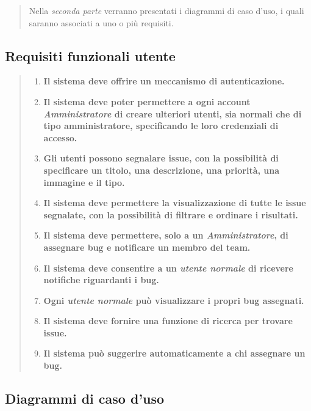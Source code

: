 \begin{quote}
Nella \textit{seconda parte} verranno presentati i diagrammi di caso d'uso, i quali saranno associati a uno o più requisiti.
\end{quote}

\subsection{Requisiti funzionali utente}
\begin{quote}
\begin{enumerate}[label=\textit{RF\arabic*}]
  \item \textbf{Il sistema deve offrire un meccanismo di autenticazione.}
    
  \item \textbf{Il sistema deve poter permettere a ogni account \textit{Amministratore} di creare ulteriori utenti, sia normali che di tipo amministratore, specificando le loro credenziali di accesso. }
  
  \item \textbf{Gli utenti possono segnalare issue, con la possibilità di specificare un titolo, una descrizione, una priorità, una immagine e il tipo.}
  
  \item \textbf{Il sistema deve permettere la visualizzazione di tutte le issue segnalate, con la possibilità di filtrare e ordinare i risultati.}
  
  \item \textbf{Il sistema deve permettere, solo a un \textit{Amministratore}, di assegnare bug e notificare un membro del team.}
  
  \item \textbf{Il sistema deve consentire a un \textit{utente normale} di ricevere notifiche riguardanti i bug.}

  \item \textbf{Ogni \textit{utente normale} può visualizzare i propri bug assegnati.}

  \item \textbf{Il sistema deve fornire una funzione di ricerca per trovare issue.}

  \item \textbf{Il sistema può suggerire automaticamente a chi assegnare un bug.}
  
\end{enumerate} 
\end{quote}

\subsection{Diagrammi di caso d'uso} 

